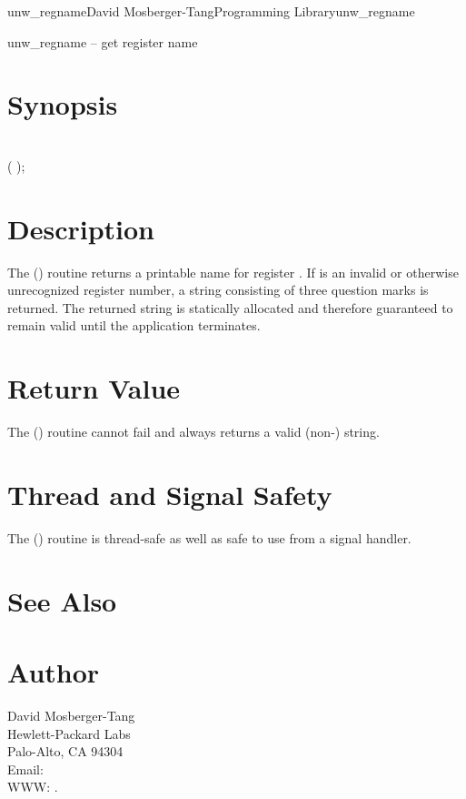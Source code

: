 \documentclass{article}
\begin{document}
\begin{Name}{3}{unw\_regname}{David Mosberger-Tang}{Programming Library}{unw\_regname}

  unw\_regname -- get register name
\end{Name}

\section{Synopsis}

\\

( );\\

\section{Description}

The () routine returns a printable name for
register .  If  is an invalid or otherwise
unrecognized register number, a string consisting of three question
marks is returned.  The returned string is statically allocated and
therefore guaranteed to remain valid until the application terminates.

\section{Return Value}

The () routine cannot fail and always returns a
valid (non-) string.

\section{Thread and Signal Safety}

The () routine is thread-safe as well as safe to
use from a signal handler.

\section{See Also}


\section{Author}

\noindent
David Mosberger-Tang\\
Hewlett-Packard Labs\\
Palo-Alto, CA 94304\\
Email: \\
WWW: .
\LatexManEnd
\end{document}
